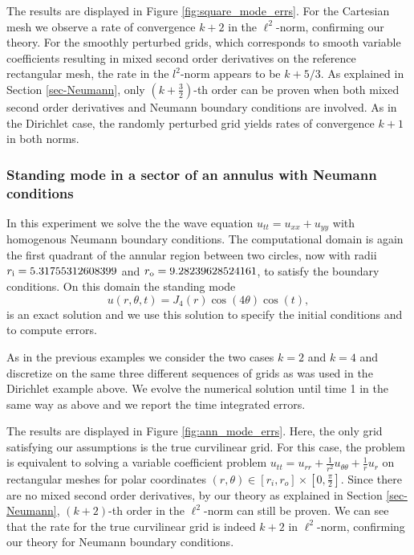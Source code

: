 \documentclass[onefignum,onetabnum]{siamart171218}
\begin{document}
The results are displayed in Figure \ref{fig:square_mode_errs}. 
 For the Cartesian mesh  we observe a rate of convergence $k+2$ in the $\ell^2$-norm, confirming our theory. 
For the smoothly perturbed grids, which corresponds to   smooth variable coefficients resulting in mixed second order derivatives on the reference rectangular mesh,
  the rate in the $l^2$-norm appears to be $k+5/3$. As explained in Section \ref{sec-Neumann}, only $(k+\frac32)$-th order can be proven when both mixed second order derivatives and Neumann boundary conditions are involved.
 As in the Dirichlet case, the randomly perturbed grid yields rates of convergence   $k+1$ in both norms. 
\subsubsection{Standing mode in a sector of an annulus with Neumann conditions} \label{sec:ann_mode}
In this experiment we solve the the wave equation  $u_{tt}=u_{xx}+u_{yy}$  with homogenous Neumann boundary conditions. The computational domain is again the first quadrant of the annular region between two circles, now with radii $r_{\rm i}= 5.31755312608399$ and  $r_{\rm o} = 9.28239628524161$, to satisfy the boundary conditions.
On this domain the standing mode 
\[
u(r,\theta,t) = J_4(r) \cos(4\theta) \cos(t),
\] 
is an exact solution and we use this solution to specify the initial conditions and to compute errors.  

As in the previous examples we consider the two cases $k = 2$ and $k=4$ and discretize on the same three different sequences of grids as was used in the Dirichlet example above. We evolve the numerical solution until time 1 in the same way as above and we report the time integrated errors.

The results are displayed in Figure \ref{fig:ann_mode_errs}. 
 Here, the only grid satisfying our assumptions is the true curvilinear grid. For this case, the problem  is equivalent to solving a variable coefficient problem $u_{tt}=u_{rr}+\frac{1}{r^2}u_{\theta\theta}+\frac{1}{r} u_r$ on rectangular meshes for polar coordinates $(r,\theta)\in [r_i, r_o]\times [0,\frac{\pi}{2}]$. Since there are no mixed second order derivatives,
by our theory as explained in Section   \ref{sec-Neumann}, $(k+2)$-th order in the $\ell^2$-norm can still be proven. We can see that the rate for the true curvilinear grid is indeed 
$k+2$ in $\ell^2$-norm, confirming our theory for Neumann boundary conditions. 
 
\end{document}

